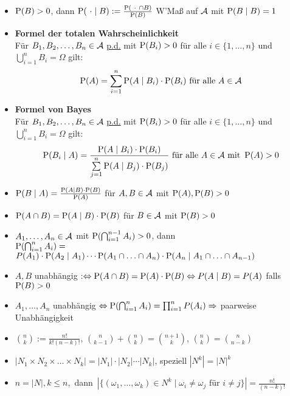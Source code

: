 \begin{itemize}
\item $\P(B)>0$, dann $\P(\ \cdot\mid B) := \frac{\P(\ \cdot\ \cap B)}{\P(B)}$
W'Maß auf $\A$ mit $\P(B\mid B)=1$

\item \textbf{Formel der totalen Wahrscheinlichkeit}\\
Für $B_1, B_2,\ldots,B_n\in\A$ \underline{p.d.} mit $\P(B_i)>0$ für alle
$i\in\{1,\ldots,n\}$ und $\bigcup_{i=1}^{n}B_i=\Omega$ gilt:
\[
	\P(A)=\sum_{i=1}^{n} \P(A\mid B_i)\cdot\P(B_i)\text{ für alle } A\in\A
\]

\item \textbf{Formel von Bayes}\\
Für $B_1, B_2,\ldots,B_n\in\A$ \underline{p.d.} mit $\P(B_i)>0$ für alle
$i\in\{1,\ldots,n\}$ und $\bigcup_{i=1}^{n}B_i=\Omega$ gilt:
\[
	\P(B_i\mid A)=
	\frac{\P(A\mid B_i)\cdot\P(B_i)}{\sum\limits_{j=1}^{n} \P(A\mid B_j)\cdot\P(B_j)}\ 
	\text{für alle } A\in\A \text{ mit } \P(A)>0
\]

\item $\P(B\mid A)=\frac{\P(A\mid B)\cdot\P(B)}{\P(A)}$ für $A,B\in\A$ mit
$\P(A),\P(B)>0$

\item $\P(A\cap B)=\P(A\mid B)\cdot\P(B)$ für $B\in\A$ mit $\P(B)>0$

\item $A_1,\ldots ,A_n\in\A$ mit $\P(\bigcap_{i=1}^{n-1} A_i)>0$, dann\\
$\P(\bigcap_{i=1}^{n} A_i)=$ 
$P(A_1)\cdot\P(A_2\mid A_1)\cdots
\P(A_1\cap\ldots\cap A_n)\cdot\P(A_n\mid A_1\cap\ldots\cap A_{n-1})$

\item $A,B$ unabhängig $:\Leftrightarrow \P(A\cap B)=\P(A)\cdot\P(B)
\Leftrightarrow P(A\mid B) = P(A)$ falls $\P(B)>0$

\item $A_1,\ldots ,A_n$ unabhängig 
$\Leftrightarrow\P(\bigcap_{i=1}^{n}A_i)=\prod_{i=1}^{n} P(A_i)
\Rightarrow$ paarweise Unabhängigkeit

\item $\binom{n}{k}:= \frac{n!}{k!(n-k)!}$, 
$\binom{n}{k-1}+\binom{n}{k}=\binom{n+1}{k}$,
$\binom{n}{k}=\binom{n}{n-k}$

\item $ |N_1 \times N_2 \times\dots\times N_k| = |N_1| \cdot |N_2| \cdots |N_k|$,
speziell $|N^k| = {|N|}^k$

\item \mbox{$n=|N|,k\leq n$, dann $|\{(\omega_1,\ldots,\omega_k)\in N^k 
\mid\omega_i\neq\omega_j\text { für }i\neq j\}|=\frac{n!}{(n-k)!}$}


\end{itemize}
